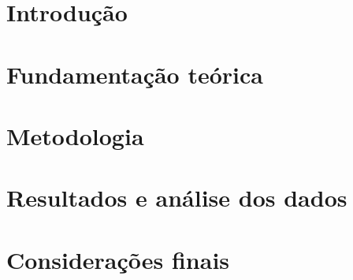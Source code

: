 \documentclass[monografia]{ufape}
\begin{document}
\iniciotexto

\chapter{Introdução}


\chapter{Fundamentação teórica}


\chapter{Metodologia}


\chapter{Resultados e análise dos dados}


\chapter{Considerações finais}


\begin{referencias}
  
\end{referencias}








\end{document}
